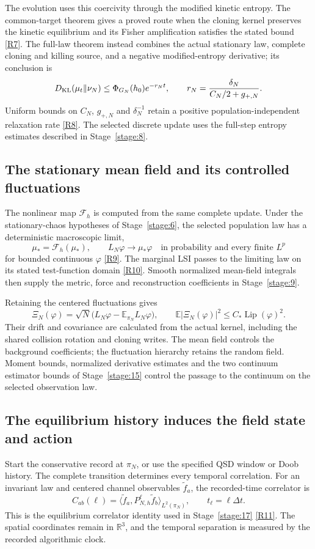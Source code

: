 \documentclass[11pt,a4paper]{article}
\begin{document}
The evolution uses this coercivity through the modified kinetic entropy. The common-target theorem gives a proved route when the cloning kernel preserves the kinetic equilibrium and its Fisher amplification satisfies the stated bound \hyperref[src:thm-main-kl-convergence]{[R7]}. The full-law theorem instead combines the actual stationary law, complete cloning and killing source, and a negative modified-entropy derivative; its conclusion is
\[
D_{\rm KL}(\mu_t\Vert\nu_N)
\le\Phi_{G_N}(h_0)e^{-r_Nt},
\qquad
r_N=\frac{\delta_N}{C_N/2+g_{+,N}}.
\]
Uniform bounds on \(C_N\), \(g_{+,N}\) and \(\delta_N^{-1}\) retain a positive population-independent relaxation rate \hyperref[src:thm-kl-convergence-euclidean]{[R8]}. The selected discrete update uses the full-step entropy estimates described in Stage~\ref{stage:8}.

\subsection*{The stationary mean field and its controlled fluctuations}
The nonlinear map \(\mathcal F_h\) is computed from the same complete update. Under the stationary-chaos hypotheses of Stage~\ref{stage:6}, the selected population law has a deterministic macroscopic limit,
\[
\mu_*=\mathcal F_h(\mu_*),\qquad
L_N\varphi\longrightarrow\mu_*\varphi
\quad\text{in probability and every finite }L^p
\]
for bounded continuous \(\varphi\) \hyperref[src:thm-thermodynamic-limit]{[R9]}. The marginal LSI passes to the limiting law on its stated test-function domain \hyperref[src:cor-kl-lsi-mean-field-limit]{[R10]}. Smooth normalized mean-field integrals then supply the metric, force and reconstruction coefficients in Stage~\ref{stage:9}.

Retaining the centered fluctuations gives
\[
\Xi_N(\varphi)=\sqrt N
\bigl(L_N\varphi-\mathbb E_{\pi_N}L_N\varphi\bigr),
\qquad
\mathbb E|\Xi_N(\varphi)|^2
\le C_*\operatorname{Lip}(\varphi)^2.
\]
Their drift and covariance are calculated from the actual kernel, including the shared collision rotation and cloning writes. The mean field controls the background coefficients; the fluctuation hierarchy retains the random field. Moment bounds, normalized derivative estimates and the two continuum estimator bounds of Stage~\ref{stage:15} control the passage to the continuum on the selected observation law.

\subsection*{The equilibrium history induces the field state and action}
Start the conservative record at \(\pi_N\), or use the specified QSD window or Doob history. The complete transition determines every temporal correlation. For an invariant law and centered channel observables \(\widetilde f_a\), the recorded-time correlator is
\[
C_{ab}(\ell)=
\langle\widetilde f_a,P_{N,h}^{\ell}\widetilde f_b\rangle_{L^2(\pi_N)},
\qquad t_\ell=\ell\Delta t.
\]
This is the equilibrium correlator identity used in Stage~\ref{stage:17} \hyperref[src:thm-effective-twistor-spectral-meaning]{[R11]}. The spatial coordinates remain in \(\mathbb R^3\), and the temporal separation is measured by the recorded algorithmic clock.
\end{document}
